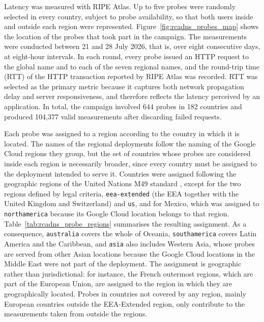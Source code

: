 Latency was measured with RIPE Atlas. Up to five probes were randomly selected in every country, subject to probe availability, so that both users inside and outside each region were represented. Figure~\ref{fig:rcadns_probes_map} shows the location of the probes that took part in the campaign. The measurements were conducted between 21 and 28 July 2026, that is, over eight consecutive days, at eight-hour intervals. In each round, every probe issued an HTTP request to the global name and to each of the seven regional names, and the round-trip time (RTT) of the HTTP transaction reported by RIPE Atlas was recorded. RTT was selected as the primary metric because it captures both network propagation delay and server responsiveness, and therefore reflects the latency perceived by an application. In total, the campaign involved 644 probes in 182 countries and produced 104,377 valid measurements after discarding failed requests.

Each probe was assigned to a region according to the country in which it is located. The names of the regional deployments follow the naming of the Google Cloud regions they group, but the set of countries whose probes are considered inside each region is necessarily broader, since every country must be assigned to the deployment intended to serve it. Countries were assigned following the geographic regions of the United Nations M49 standard \cite{UNSDMethodology}, except for the two regions defined by legal criteria, \texttt{eea-extended} (the EEA together with the United Kingdom and Switzerland) and \texttt{us}, and for Mexico, which was assigned to \texttt{northamerica} because its Google Cloud location belongs to that region. Table~\ref{tab:rcadns_probe_regions} summarises the resulting assignment. As a consequence, \texttt{australia} covers the whole of Oceania, \texttt{southamerica} covers Latin America and the Caribbean, and \texttt{asia} also includes Western Asia, whose probes are served from other Asian locations because the Google Cloud locations in the Middle East were not part of the deployment. The assignment is geographic rather than jurisdictional: for instance, the French outermost regions, which are part of the European Union, are assigned to the region in which they are geographically located. Probes in countries not covered by any region, mainly European countries outside the EEA-Extended region, only contribute to the measurements taken from outside the regions.

